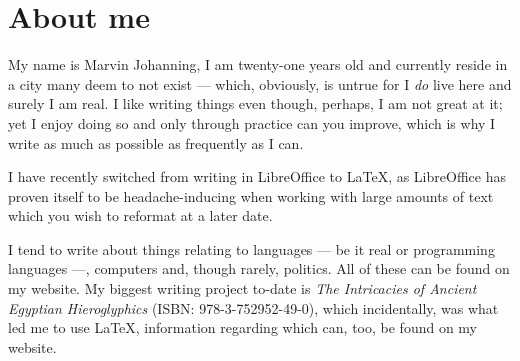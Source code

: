 \chapter*{About me}

My name is Marvin Johanning, I am twenty-one years old and currently reside in a city many deem to not exist — which, obviously, is untrue for I \textit{do} live here and surely I am real. I like writing things even though, perhaps, I am not great at it; yet I enjoy doing so and only through practice can you improve, which is why I write as much as possible as frequently as I can.

I have recently switched from writing in LibreOffice to \LaTeX, as LibreOffice has proven itself to be headache-inducing when working with large amounts of text which you wish to reformat at a later date. 

I tend to write about things relating to languages — be it real or programming languages —, computers and, though rarely, politics. All of these can be found on my website. My biggest writing project to-date is \textit{The Intricacies of Ancient Egyptian Hieroglyphics} (ISBN: 978-3-752952-49-0), which incidentally, was what led me to use \LaTeX, information regarding which can, too, be found on my website.

\newpage